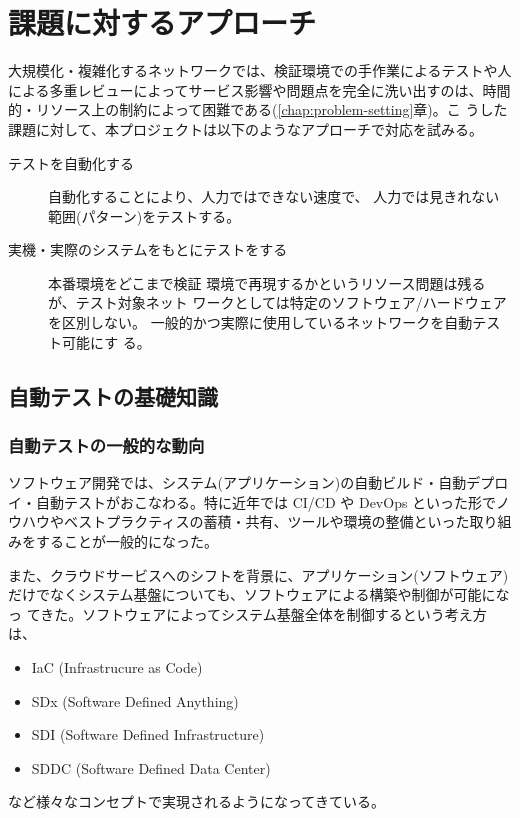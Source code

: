
\chapter{課題に対するアプローチ}
\label{chap:approach}


大規模化・複雑化するネットワークでは、検証環境での手作業によるテストや人
による多重レビューによってサービス影響や問題点を完全に洗い出すのは、時間
的・リソース上の制約によって困難である(\ref{chap:problem-setting}章)。こ
うした課題に対して、本プロジェクトは以下のようなアプローチで対応を試みる。
\begin{description}
 \item[テストを自動化する] 自動化することにより、人力ではできない速度で、
            人力では見きれない範囲(パターン)をテストする。
 \item[実機・実際のシステムをもとにテストをする] 本番環境をどこまで検証
            環境で再現するかというリソース問題は残るが、テスト対象ネット
            ワークとしては特定のソフトウェア/ハードウェアを区別しない。
            一般的かつ実際に使用しているネットワークを自動テスト可能にす
            る。
\end{description}


\section{自動テストの基礎知識}
\label{sec:latedge-test-automation}


  \subsection{自動テストの一般的な動向}
  \label{sec:popular-test-automation}

ソフトウェア開発では、システム(アプリケーション)の自動ビルド・自動デプロ
イ・自動テストがおこなわる。特に近年では CI/CD や DevOps といった形でノ
ウハウやベストプラクティスの蓄積・共有、ツールや環境の整備といった取り組
みをすることが一般的になった。

また、クラウドサービスへのシフトを背景に、アプリケーション(ソフトウェア)
だけでなくシステム基盤についても、ソフトウェアによる構築や制御が可能になっ
てきた。ソフトウェアによってシステム基盤全体を制御するという考え方は、
\begin{itemize}
 \item IaC (Infrastrucure as Code)
 \item SDx (Software Defined Anything)
 \item SDI (Software Defined Infrastructure)
 \item SDDC (Software Defined Data Center)
\end{itemize}
など様々なコンセプトで実現されるようになってきている。

